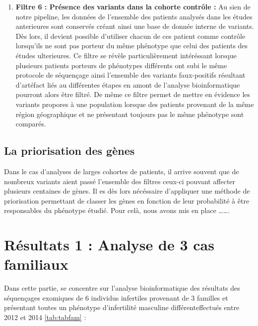 \documentclass[12pt,twoside]{reedthesis}
\theoremstyle{definition}
\theoremstyle{definition}
\theoremstyle{remark}
\begin{document}
\begin{enumerate}
  \item
    \textbf{Filtre 6 : Présence des variants dans la cohorte contrôle :}
    Au sien de notre pipeline, les données de l'ensemble des patients
    analysés dans les études anterieures sont conservés créant ainsi une
    base de donnée interne de variants. Dès lors, il devient possible
    d'utiliser chacun de ces patient comme contrôle lorsqu'ils ne sont pas
    porteur du même phénotype que celui des patients des études
    ulterieures. Ce filtre se révèle particulièrement intéréssant lorsque
    plusieurs patients porteurs de phénotypes différents ont subi le même
    protocole de séquençage ainsi l'ensemble des variants faux-positifs
    résultant d'artéfact liés au différentes étapes en amont de l'analyse
    bioinformatique pourront alors être filtré. De même ce filtre permet
    de mettre en évidence les variants propores à une population lorsque
    des patients provenant de la même région géographique et ne présentant
    toujours pas le même phénotype sont comparés.
  \end{enumerate}
  
  \newpage
  
  \subsection{La priorisation des gènes}\label{la-priorisation-des-genes}
  
  Dans le cas d'analyses de larges cohortes de patients, il arrive souvent
  que de nombreux variants aient passé l'ensemble des filtres ceux-ci
  pouvant affecter plusieurs centaines de gènes. Il es dès lors nécéssaire
  d'appliquer une méthode de priorisation permettant de classer les gènes
  en fonction de leur probabilité à être responsables du phénotype étudié.
  Pour celà, nous avons mis en place \ldots{}\ldots{}.
  
  \newpage
  
  \section{Résultats 1 : Analyse de 3 cas
  familiaux}\label{resultats-1-analyse-de-3-cas-familiaux}
  
  Dans cette partie, se concentre sur l'analyse bioinformatique des
  résultats des séquençages exomiques de 6 individus infertiles provenant
  de 3 familles et présentant toutes un phénotype d'infertilité masculine
  différenteffectués entre 2012 et 2014 \ref{tab:tabfam} :
  
\end{document}
